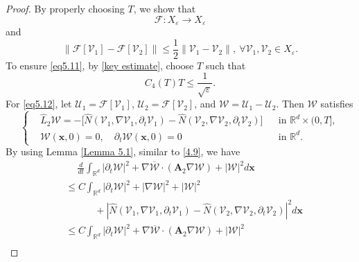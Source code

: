 \documentclass[11pt,reqno,oneside]{amsart}
\numberwithin{equation}{section}
\theoremstyle{definition}
\theoremstyle{remark}
\numberwithin{equation}{section}
\begin{document}
\begin{proof}
		By properly choosing $T$, we show that 
		\begin{equation}\label{eq5.11}
			\mathscr{F}: X_\varepsilon \to X_\varepsilon
		\end{equation}
		and 
		\begin{equation}\label{eq5.12}
			\|\mathscr{F}[\mathscr{V}_1]-\mathscr{F}[\mathscr{V}_2]\|\leqslant \frac{1}{2}\|\mathscr{V}_1-\mathscr{V}_2\|, \ \forall \mathscr{V}_1,\mathscr{V}_2 \in X_\varepsilon. 
		\end{equation}
		To ensure \eqref{eq5.11}, by \eqref{key estimate}, choose \(T\) such that
		\begin{equation}\label{eq:5.13}
			C_4(T) T \leqslant \frac{1}{\sqrt{\varepsilon}}.
		\end{equation}
		For \eqref{eq5.12}, let \(\mathscr{U}_1 = \mathscr{F}[\mathscr{V}_1]\), \(\mathscr{U}_2 = \mathscr{F}[\mathscr{V}_2]\), and \(\mathscr{W} = \mathscr{U}_1 - \mathscr{U}_2\). Then \(\mathscr{W}\) satisfies
		\begin{equation}
			\left\{
			\begin{aligned}
				&\hat{L}_2\mathscr{W}=  -\big[\hat{N}(\mathscr{V}_1, \nabla \mathscr{V}_1, \partial_t \mathscr{V}_1)-\hat{N}(\mathscr{V}_2, \nabla \mathscr{V}_2, \partial_t \mathscr{V}_2)\big] && \text{in } \mathbb{R}^d \times (0,T], \\
				&\mathscr{W}(\mathbf{x},0) = 0, \quad \partial_t \mathscr{W}(\mathbf{x},0) = 0 && \text{in } \mathbb{R}^d.
			\end{aligned}
			\right.
		\end{equation} By using Lemma \eqref{Lemma 5.1},  similar to \eqref{4.9}, we have 
		\begin{equation}\label{5.15}
			\begin{aligned}
				&~\quad \frac{d}{d t} \int_{\mathbb{R}^d}|\partial_{t}\mathscr{W}|^2+\nabla \overline{\mathscr{W}} \cdot (\mathbf{A}_2\nabla \mathscr{W}) +|\mathscr{W}|^2 d\mathbf{x}\\
				&\leqslant C\int_{\mathbb{R}^d}\left| \partial _t \mathscr{W} \right|^2+|\nabla \mathscr{W}|^2+|\mathscr{W}|^2\\
				&\quad \quad \quad+\left|\hat{N}(\mathscr{V}_1, \nabla \mathscr{V}_1, \partial_t \mathscr{V}_1)-\hat{N}(\mathscr{V}_2, \nabla \mathscr{V}_2, \partial_t \mathscr{V}_2) \right|^2d\mathbf{x}\\
				&\leqslant C\int_{\mathbb{R}^d}|\partial_{t}\mathscr{W}|^2+\nabla \overline{\mathscr{W}} \cdot (\mathbf{A}_2 \nabla \mathscr{W}) +|\mathscr{W}|^2\\

\end{aligned}
\end{equation}
\end{proof}
\end{document}
